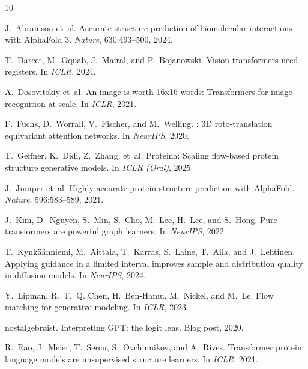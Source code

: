 \documentclass{article}
\begin{document}

\begin{thebibliography}{10}

J.~Abramson et~al.
\newblock Accurate structure prediction of biomolecular interactions with {AlphaFold} 3.
\newblock \emph{Nature}, 630:493--500, 2024.

T.~Darcet, M.~Oquab, J.~Mairal, and P.~Bojanowski.
\newblock Vision transformers need registers.
\newblock In \emph{ICLR}, 2024.

A.~Dosovitskiy et~al.
\newblock An image is worth 16x16 words: Transformers for image recognition at scale.
\newblock In \emph{ICLR}, 2021.


F.~Fuchs, D.~Worrall, V.~Fischer, and M.~Welling.
: 3{D} roto-translation equivariant attention networks.
\newblock In \emph{NeurIPS}, 2020.

T.~Geffner, K.~Didi, Z.~Zhang, et~al.
\newblock Proteina: Scaling flow-based protein structure generative models.
\newblock In \emph{ICLR (Oral)}, 2025.

J.~Jumper et~al.
\newblock Highly accurate protein structure prediction with {AlphaFold}.
\newblock \emph{Nature}, 596:583--589, 2021.

J.~Kim, D.~Nguyen, S.~Min, S.~Cho, M.~Lee, H.~Lee, and S.~Hong.
\newblock Pure transformers are powerful graph learners.
\newblock In \emph{NeurIPS}, 2022.

T.~Kynk\"{a}\"{a}nniemi, M.~Aittala, T.~Karras, S.~Laine, T.~Aila, and J.~Lehtinen.
\newblock Applying guidance in a limited interval improves sample and distribution quality in diffusion models.
\newblock In \emph{NeurIPS}, 2024.

Y.~Lipman, R.~T.~Q. Chen, H.~Ben-Hamu, M.~Nickel, and M.~Le.
\newblock Flow matching for generative modeling.
\newblock In \emph{ICLR}, 2023.

nostalgebraist.
\newblock Interpreting {GPT}: the logit lens.
\newblock Blog post, 2020.

R.~Rao, J.~Meier, T.~Sercu, S.~Ovchinnikov, and A.~Rives.
\newblock Transformer protein language models are unsupervised structure learners.
\newblock In \emph{ICLR}, 2021.


\end{thebibliography}
\end{document}
